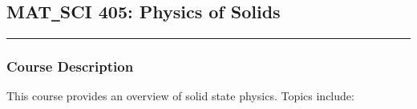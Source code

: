 	\subsection{MAT\texttt{\_}SCI 405: Physics of Solids}
	\vspace{-0.5em} \hfill \rule{0.4\textwidth}{.4pt}\newline
	\null \hfill {} \newline
	\null \hfill {}
\normalfont
		\subsubsection*{Course Description}
		This course provides an overview of solid state physics. Topics include:
		
